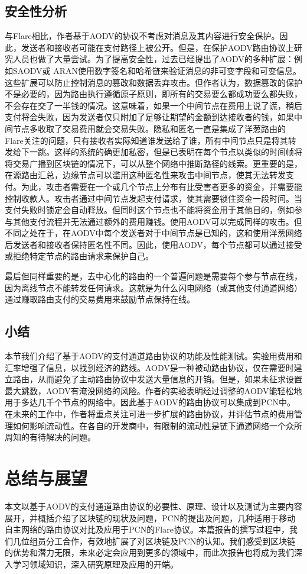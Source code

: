 \documentclass[12pt,a4paper]{article}
\begin{document}
\subsection{安全性分析}
与Flare相比，作者基于AODV的协议不考虑对消息及其内容进行安全保护。因此，发送者和接收者可能在支付路径上被公开。但是，在保护AODV路由协议上研究人员也做了大量尝试。为了提高安全性，过去已经提出了AODV的多种扩展：例如SAODV或 ARAN使用数字签名和哈希链来验证消息的非可变字段和可变信息。这些扩展可以防止控制消息的篡改和数据丢弃攻击。但作者认为，数据篡改的保护不是必要的，因为路由执行遵循原子原则，即所有的交易要么都成功要么都失败，不会存在交了一半钱的情况。这意味着，如果一个中间节点在费用上说了谎，稍后支付将会失败，因为发送者仅只附加了足够让期望的金额到达接收者的钱，如果中间节点多收取了交易费用就会交易失败。隐私和匿名一直是集成了洋葱路由的Flare关注的问题，只有接收者实际知道谁发送给了谁，所有中间节点只是将其转发给下一跳。这样的系统的确更加私密，但是已表明在每个节点以类似的时间帧将将交易广播到区块链的情况下，可以从整个网络中推断路径的线索。更重要的是，在源路由汇总，边缘节点可以滥用这种匿名性来攻击中间节点，使其无法转发支付。为此，攻击者需要在一个或几个节点上分布有比受害者更多的资金，并需要能控制收款人。攻击者通过中间节点发起支付请求，使其需要锁住资金一段时间。当支付失败时锁定会自动释放。但同时这个节点也不能将资金用于其他目的，例如参与其他支付流程并无法通过额外的费用赚钱。使用AODV可以完成同样的攻击。但不同之处在于，在AODV中每个发送者对于中间节点是已知的，这和使用洋葱网络后发送者和接收者保持匿名性不同。因此，使用AODV，每个节点都可以通过接受或拒绝特定节点的路由请求来保护自己。

最后但同样重要的是，去中心化的路由的一个普遍问题是需要每个参与节点在线，因为离线节点不能转发任何请求。这就是为什么闪电网络（或其他支付通道网络）通过赚取路由支付的交易费用来鼓励节点保持在线。

\subsection{小结}
本节我们介绍了基于AODV的支付通道路由协议的功能及性能测试。实验用费用和汇率增强了信息，以找到经济的路线。AODV是一种被动路由协议，仅在需要时建立路由，从而避免了主动路由协议中发送大量信息的开销。但是，如果未征求设置最大跳数，AODV有淹没网络的风险。作者的实验表明经过调整的AODV能轻松地用于多达几千个节点的网络中。因此基于AODV的路由协议可以集成到PCN中。在未来的工作中，作者将重点关注可进一步扩展的路由协议，并评估节点的费用管理如何影响流动性。在各自的开发商中，有限制的流动性是链下通道网络一个众所周知的有待解决的问题。

\clearpage
\section{总结与展望}
本文以基于AODV的支付通道路由协议的必要性、原理、设计以及测试为主要内容展开，并概括介绍了区块链的现状及问题，PCN的提出及问题，几种适用于移动自主网络的路由协议对比及应用于PCN的Flare协议。本篇报告的撰写过程中，我们几位组员分工合作，有效地扩展了对区块链及PCN的认知。我们感受到区块链的优势和潜力无限，未来必定会应用到更多的领域中，而此次报告也将成为我们深入学习领域知识，深入研究原理及应用的开端。

\clearpage


\end{document}
